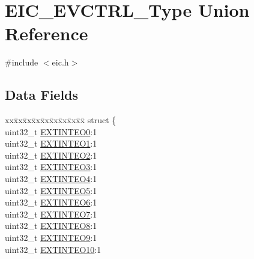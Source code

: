 \hypertarget{union_e_i_c___e_v_c_t_r_l___type}{}\section{E\+I\+C\+\_\+\+E\+V\+C\+T\+R\+L\+\_\+\+Type Union Reference}
\label{union_e_i_c___e_v_c_t_r_l___type}


{\ttfamily \#include $<$eic.\+h$>$}

\subsection*{Data Fields}
\begin{DoxyCompactItemize}
\item 
\begin{tabbing}
xx\=xx\=xx\=xx\=xx\=xx\=xx\=xx\=xx\=\kill
struct \{\\
\>uint32\_t \mbox{\hyperlink{union_e_i_c___e_v_c_t_r_l___type_a9476c90369a989a08ebdcc4964948659}{EXTINTEO0}}:1\\
\>uint32\_t \mbox{\hyperlink{union_e_i_c___e_v_c_t_r_l___type_ab477164d10c9cbf7e023a6baa3d6b8d0}{EXTINTEO1}}:1\\
\>uint32\_t \mbox{\hyperlink{union_e_i_c___e_v_c_t_r_l___type_afadd02af5ac4ef389b2cb2f686856458}{EXTINTEO2}}:1\\
\>uint32\_t \mbox{\hyperlink{union_e_i_c___e_v_c_t_r_l___type_ae2661c71037d12480cc5f261ccd94c4e}{EXTINTEO3}}:1\\
\>uint32\_t \mbox{\hyperlink{union_e_i_c___e_v_c_t_r_l___type_ade08cfab4750cbec840baf0ddaa76e15}{EXTINTEO4}}:1\\
\>uint32\_t \mbox{\hyperlink{union_e_i_c___e_v_c_t_r_l___type_a2c6f52ca7412eadad6ea2d39763f77b3}{EXTINTEO5}}:1\\
\>uint32\_t \mbox{\hyperlink{union_e_i_c___e_v_c_t_r_l___type_a84f0d8aed283fdf0a38c0aa2671309f6}{EXTINTEO6}}:1\\
\>uint32\_t \mbox{\hyperlink{union_e_i_c___e_v_c_t_r_l___type_af53a6aef87028eb5bb72c4054d55ce01}{EXTINTEO7}}:1\\
\>uint32\_t \mbox{\hyperlink{union_e_i_c___e_v_c_t_r_l___type_a54cb54548da358805cbcb11b3b147235}{EXTINTEO8}}:1\\
\>uint32\_t \mbox{\hyperlink{union_e_i_c___e_v_c_t_r_l___type_aeb36e52ac1ce38b6c7968e1d6a78821b}{EXTINTEO9}}:1\\
\>uint32\_t \mbox{\hyperlink{union_e_i_c___e_v_c_t_r_l___type_ab119b72d246235b69bc3a54ca090ea0b}{EXTINTEO10}}:1\\

\end{tabbing}
\end{DoxyCompactItemize}
